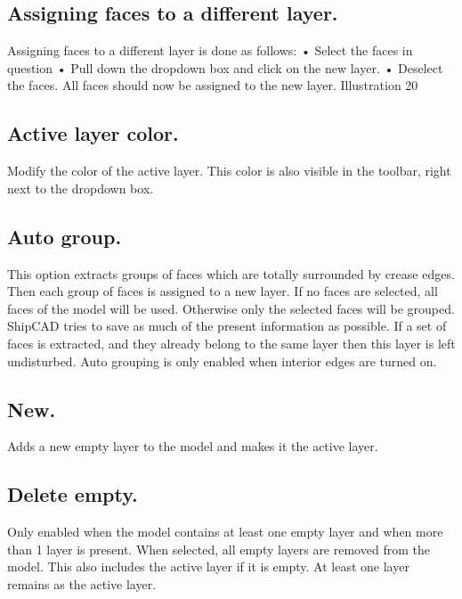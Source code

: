 \documentclass[12pt]{article}
\begin{document}
\subsection{Assigning faces to a different layer.}
Assigning faces to a different layer is done as follows:
• Select the faces in question
• Pull down the dropdown box and click on the new
layer.
• Deselect the faces.
All faces should now be assigned to the new layer.
Illustration 20

\subsection{Active layer color.}
Modify the color of the active layer. This color is also visible in the toolbar, right next to the
dropdown box.

\subsection{Auto group.}
This option extracts groups of faces which are totally surrounded by crease edges. Then each
group of faces is assigned to a new layer. If no faces are selected, all faces of the model will be
used. Otherwise only the selected faces will be grouped. ShipCAD tries to save as much of the
present information as possible. If a set of faces is extracted, and they already belong to the same
layer then this layer is left undisturbed. Auto grouping is only enabled when interior edges are
turned on.

\subsection{New.}
Adds a new empty layer to the model
and makes it the active layer.

\subsection{Delete empty.}
Only enabled when the model contains at least one empty layer and when more than 1 layer is
present. When selected, all empty layers are removed from the model. This also includes the active
layer if it is empty. At least one layer remains as the active layer.
\end{document}
